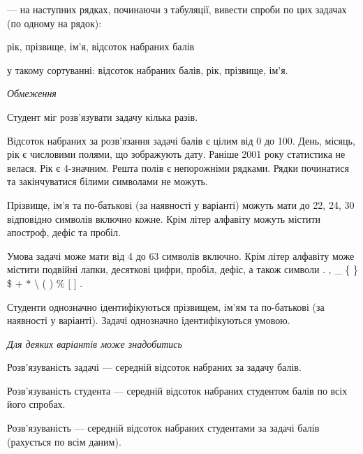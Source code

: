 \documentclass[11pt, ukrainian]{article}
\begin{document}
{\noindent}--- на наступних рядках, починаючи з табуляції, вивести спроби по цих задачах (по одному на рядок):\par
рік, прізвище, ім’я, відсоток набраних балів

{\noindent}у такому сортуванні: відсоток набраних балів, рік, прізвище, ім’я.


\bigskip\textit{Обмеження}

Студент міг розв’язувати задачу кілька разів.

Відсоток набраних за розв’язання задачі балів є цілим від 0 до 100.
День, місяць, рік є числовими полями, що зображують дату.
Раніше 2001 року статистика не велася. Рік є 4-значним.
Решта полів є непорожніми рядками.
Рядки починатися та закінчуватися білими символами не можуть.

Прізвище, ім’я та по-батькові (за наявності у варіанті) можуть мати до 22, 24, 30 відповідно символів включно кожне. 
Крім літер алфавіту можуть містити апостроф, дефіс та пробіл.

Умова задачі може мати від 4 до 63 символів включно.
Крім літер алфавіту може містити подвійні лапки, десяткові цифри, пробіл, дефіс,
а також символи . , \_ \{ \} \$ $+$ $*$ {\textbackslash} ( ) \% $[$ $]$ .

Студенти однозначно ідентифікуються прізвищем, ім’ям та по-батькові (за наявності у варіанті).
Задачі однозначно ідентифікуються умовою.

\bigskip\textit{Для деяких варіантів може знадобитись}

Розв'язуваність задачі --- середній відсоток набраних за задачу балів.

Розв'язуваність студента --- середній відсоток набраних студентом балів по всіх його спробах.

Розв'язуваність --- середній відсоток набраних студентами за задачі балів (рахується по всім даним).


\par
\newpage
\end{document}
